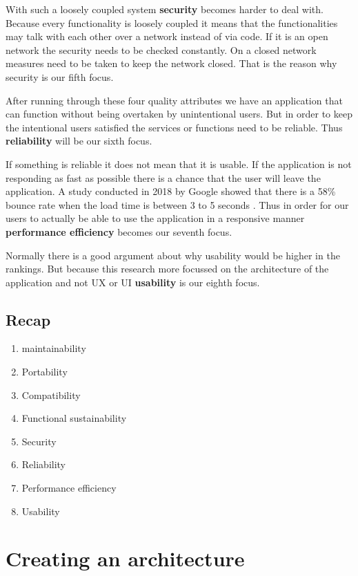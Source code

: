 With such a loosely coupled system \textbf{security} becomes harder to deal with. Because every functionality is loosely coupled it means that the functionalities may talk with each other over a network instead of via code. If it is an open network the security needs to be checked constantly. On a closed network measures need to be taken to keep the network closed. That is the reason why security is our fifth focus.

After running through these four quality attributes we have an application that can function without being overtaken by unintentional users. But in order to keep the intentional users satisfied the services or functions need to be reliable. Thus \textbf{reliability} will be our sixth focus.

If something is reliable it does not mean that it is usable. If the application is not responding as fast as possible there is a chance that the user will leave the application. A study conducted in 2018 by Google showed that there is a 58\% bounce rate when the load time is between 3 to 5 seconds \cite{bounceRateDifference}. Thus in order for our users to actually be able to use the application in a responsive manner \textbf{performance efficiency} becomes our seventh focus.

Normally there is a good argument about why usability would be higher in the rankings. But because this research more focussed on the architecture of the application and not UX or UI \textbf{usability} is our eighth focus.

\subsection{Recap}
\label{sec:IsoRecap}

\begin{enumerate}
        \item maintainability
        \item Portability
        \item Compatibility
        \item Functional sustainability
        \item Security
        \item Reliability
        \item Performance efficiency
        \item Usability
\end{enumerate}

\section{Creating an architecture}

